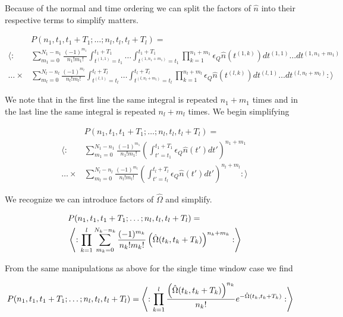 \documentclass[12pt]{article}
\begin{document}
Because of the normal and time ordering we can split the factors of $\hat{n}$ into their respective terms to simplify matters.

\begin{align}
&P(n_1,t_1,t_1+T_1;\ldots ;n_l,t_l,t_l+T_l) =\\
\Bigg \langle: &\sum_{m_1=0}^{N_1-n_1} \frac{(-1)^{m_1}}{n_1 ! m_1!} \int_{t^{(1,1)}=t_1}^{t_1+T_1} \ldots \int_{t^{(1,n_1+m_1)}=t_1}^{t_1+T_1} \prod_{k=1}^{n_1+m_1} \epsilon_Q \hat{n}(t^{(1,k)}) dt^{(1,1)} \ldots dt^{(1,n_1+m_1)}\\
\ldots \times &\sum_{m_l=0}^{N_l-n_l} \frac{(-1)^{m_l}}{n_l ! m_l!} \int_{t^{(l,1)}=t_l}^{t_l+T_l} \ldots \int_{t^{(l,n_l+m_l)}=t_l}^{t_l+T_l} \prod_{k=1}^{n_l+m_l} \epsilon_Q \hat{n}(t^{(l,k)}) dt^{(l,1)} \ldots dt^{(l,n_l+m_l)}:\Bigg \rangle
\end{align}

We note that in the first line the same integral is repeated $n_1+m_1$ times and in the last line the same integral is repeated $n_l+m_l$ times. We begin simplifying

\begin{align}
&P(n_1,t_1,t_1+T_1;\ldots ;n_l,t_l,t_l+T_l) =\\
\Bigg \langle: &\sum_{m_1=0}^{N_1-n_1} \frac{(-1)^{m_1}}{n_1 ! m_1!} \left(\int_{t'=t_1}^{t_1+T_1} \epsilon_Q \hat{n}(t') dt' \right)^{n_1+m_1}\\
\ldots \times &\sum_{m_l=0}^{N_l-n_l} \frac{(-1)^{m_l}}{n_l ! m_l!} \left(\int_{t'=t_l}^{t_l+T_l} \epsilon_Q \hat{n}(t') dt' \right)^{n_l+m_l} :\Bigg \rangle
\end{align}

We recognize we can introduce factors of $\hat{\Omega}$ and simplify.

\begin{align}
&P(n_1,t_1,t_1+T_1;\ldots ;n_l,t_l,t_l+T_l) =\\
&\Braket{:\prod_{k=1}^{l} \sum_{m_k=0}^{N_k-n_k} \frac{(-1)^{m_k}}{n_k! m_k!} \left(\hat{\Omega}(t_k,t_k+T_k)\right)^{n_k+m_k} :}
\end{align}

From the same manipulations as above for the single time window case we find

\begin{align}
&P(n_1,t_1,t_1+T_1;\ldots ;n_l,t_l,t_l+T_l) = \Braket{:\prod_{k=1}^l \frac{\left(\hat{\Omega}(t_k,t_k+T_k)\right)^{n_k}}{n_k!} e^{-\hat{\Omega}(t_k,t_k+T_k)} :}
\end{align}
\end{document}
